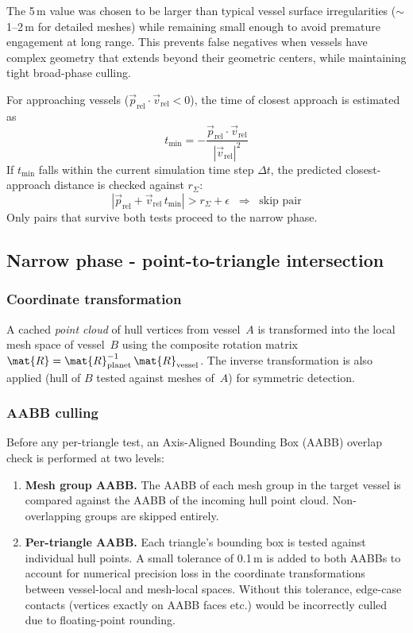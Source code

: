 \documentclass[Orbiter Technical Reference.tex]{subfiles}
\begin{document}
The 5\,m value was chosen to be larger than typical vessel surface 
irregularities ($\sim$1--2\,m for detailed meshes) while remaining small 
enough to avoid premature engagement at long range. This prevents 
false negatives when vessels have complex geometry that extends beyond 
their geometric centers, while maintaining tight broad-phase culling.

For approaching vessels ($\vec{p}_{\mathrm{rel}} \cdot \vec{v}_{\mathrm{rel}} < 0$),
the time of closest approach is estimated as
\begin{equation*}
t_{\mathrm{min}} = -\frac{\vec{p}_{\mathrm{rel}} \cdot \vec{v}_{\mathrm{rel}}}
                         {|\vec{v}_{\mathrm{rel}}|^2}
\end{equation*}
If $t_{\mathrm{min}}$ falls within the current simulation time step $\Delta t$,
the predicted closest-approach distance is checked against $r_{\Sigma}$:
\begin{equation*}
|\vec{p}_{\mathrm{rel}} + \vec{v}_{\mathrm{rel}}\,t_{\mathrm{min}}|
> r_{\Sigma} + \epsilon
\;\;\Rightarrow\;\; \text{skip pair}
\end{equation*}
Only pairs that survive both tests proceed to the narrow phase.


\subsection{Narrow phase - point-to-triangle intersection}
\label{ssec:narrowphase}

\subsubsection{Coordinate transformation}
A cached \emph{point cloud} of hull vertices from vessel~$A$ is transformed
into the local mesh space of vessel~$B$ using the composite rotation matrix
$\mat{R} = \mat{R}_{\mathrm{planet}}^{-1}\,\mat{R}_{\mathrm{vessel}}$.
The inverse transformation is also applied (hull of $B$ tested against
meshes of~$A$) for symmetric detection.

\subsubsection{AABB culling}
Before any per-triangle test, an Axis-Aligned Bounding Box (AABB) overlap
check is performed at two levels:

\begin{enumerate}
\item \textbf{Mesh group AABB.} The AABB of each mesh group in the target
      vessel is compared against the AABB of the incoming hull point cloud.
      Non-overlapping groups are skipped entirely.
\item \textbf{Per-triangle AABB.} Each triangle's bounding box is tested
against individual hull points. A small tolerance of 0.1\,m is added
to both AABBs to account for numerical precision loss in the 
coordinate transformations between vessel-local and mesh-local spaces.
Without this tolerance, edge-case contacts (vertices exactly on AABB
faces etc.) would be incorrectly culled due to floating-point rounding.
\end{enumerate}
\end{document}
